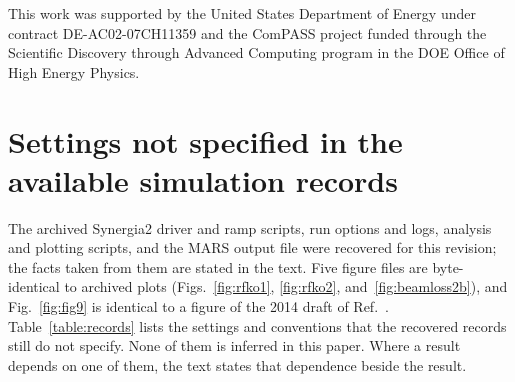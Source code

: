 \documentclass[a4paper,fleqn]{cas-sc}
\begin{document}
This work was supported by the United States Department of Energy under contract DE-AC02-07CH11359 and the ComPASS project funded through the Scientific Discovery through Advanced Computing program in the DOE Office of High Energy Physics.


\clearpage
\appendix
\section{\label{app:records}Settings not specified in the available simulation records}

The archived Synergia2 driver and ramp scripts, run options and logs, analysis and plotting scripts, and the MARS output file were recovered for this revision; the facts taken from them are stated in the text. Five figure files are byte-identical to archived plots (Figs.~\ref{fig:rfko1}, \ref{fig:rfko2}, and~\ref{fig:beamloss2b}), and Fig.~\ref{fig:fig9} is identical to a figure of the 2014 draft of Ref.~\cite{mu2e}. Table~\ref{table:records} lists the settings and conventions that the recovered records still do not specify. None of them is inferred in this paper. Where a result depends on one of them, the text states that dependence beside the result.
\end{document}
